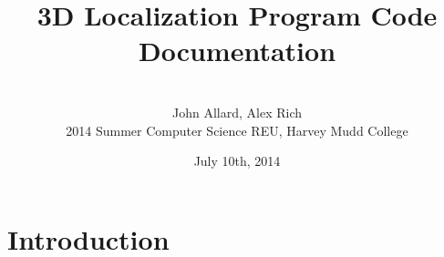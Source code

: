 \documentclass[a4paper,11pt]{article}
\title{3D Localization Program Code Documentation}
\author{ \\[7in]  John Allard, Alex Rich \\ 2014 Summer Computer Science REU, Harvey Mudd College}
\date{July 10th, 2014}
\begin{document}
	\maketitle
	\newpage

    \tableofcontents
    \newpage

	\section{Introduction}
	
\end{document}
